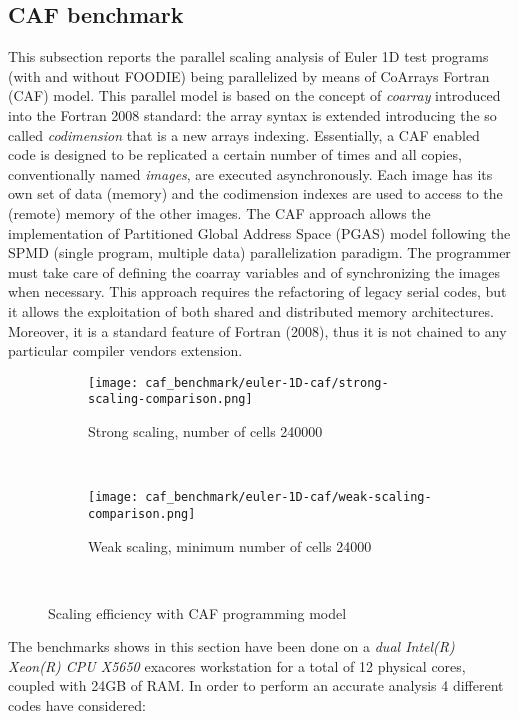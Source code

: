 \subsection{CAF benchmark}\label{subsec:caf}

This subsection reports the parallel scaling analysis of Euler 1D test programs (with and without FOODIE) being parallelized by means of CoArrays Fortran (CAF) model. This parallel model is based on the concept of \emph{coarray} introduced into the Fortran 2008 standard: the array syntax is extended introducing the so called \emph{codimension} that is a new arrays indexing. Essentially, a CAF enabled code is designed to be replicated a certain number of times and all copies, conventionally named \emph{images}, are executed asynchronously. Each image has its own set of data (memory) and the codimension indexes are used to access to the (remote) memory of the other images. The CAF approach allows the implementation of Partitioned Global Address Space (PGAS) model following the SPMD (single program, multiple data) parallelization paradigm. The programmer must take care of defining the coarray variables and of synchronizing the images when necessary. This approach requires the refactoring of legacy serial codes, but it allows the exploitation of both shared and distributed memory architectures. Moreover, it is a standard feature of Fortran (2008), thus it is not chained to any particular compiler vendors extension.

\begin{figure}[!ht]
  \centering
  \begin{subfigure}[b]{0.80\textwidth}
    \centering
    \texttt{[image: caf\_benchmark/euler-1D-caf/strong-scaling-comparison.png]}
    \caption{Strong scaling, number of cells 240000}\label{fig:strong-scaling-caf}
  \end{subfigure}\\
  \begin{subfigure}[b]{0.80\textwidth}
    \centering
    \texttt{[image: caf\_benchmark/euler-1D-caf/weak-scaling-comparison.png]}
    \caption{Weak scaling, minimum number of cells 24000}\label{fig:weak-scaling-caf}
  \end{subfigure}\\
  \caption{Scaling efficiency with CAF programming model}\label{fig:scaling-caf}
\end{figure}

The benchmarks shows in this section have been done on a \emph{dual Intel(R) Xeon(R) CPU X5650} exacores workstation for a total of 12 physical cores, coupled with 24GB of RAM. In order to perform an accurate analysis 4 different codes have considered:

